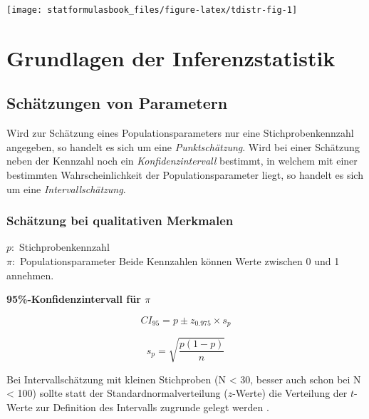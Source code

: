 \documentclass[
]{book}
\begin{document}
\begin{center}\texttt{[image: statformulasbook\_files/figure-latex/tdistr-fig-1]} \end{center}

\hypertarget{grundlagen-der-inferenzstatistik}{%
\chapter{Grundlagen der Inferenzstatistik}\label{grundlagen-der-inferenzstatistik}}

\hypertarget{schuxe4tzungen-von-parametern}{%
\section{Schätzungen von Parametern}\label{schuxe4tzungen-von-parametern}}

Wird zur Schätzung eines Populationsparameters nur eine Stichprobenkennzahl angegeben, so handelt es sich um eine \emph{Punktschätzung}. Wird bei einer Schätzung neben der Kennzahl noch ein \emph{Konfidenzintervall} bestimmt, in welchem mit einer bestimmten Wahrscheinlichkeit der Populationsparameter liegt, so handelt es sich um eine \emph{Intervallschätzung}.

\hypertarget{schuxe4tzung-bei-qualitativen-merkmalen}{%
\subsection{Schätzung bei qualitativen Merkmalen}\label{schuxe4tzung-bei-qualitativen-merkmalen}}

\(p:\) Stichprobenkennzahl\\
\(\pi:\) Populationsparameter
Beide Kennzahlen können Werte zwischen 0 und 1 annehmen.

\textbf{95\%-Konfidenzintervall für \(\pi\)}

\begin{equation}
  CI_{95} = p \pm z_{0.975} \times s_p
  \label{eq:ciqualz}
\end{equation}

\begin{equation}
  s_p = \sqrt{\frac{p(1 - p)}{n}}
  \label{eq:sp}
\end{equation}

Bei Intervallschätzung mit kleinen Stichproben (N \textless{} 30, besser auch schon bei N \textless{} 100) sollte statt der Standardnormalverteilung (\(z\)-Werte) die Verteilung der \(t\)-Werte zur Definition des Intervalls zugrunde gelegt werden \citep{Leonhart2013}.
\end{document}
